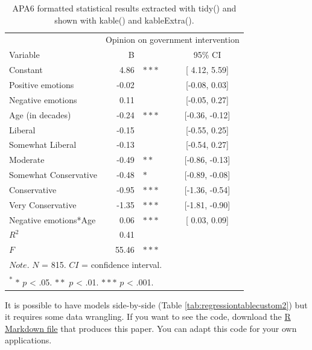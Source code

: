 \documentclass[doc,floatsintext]{apa6}
\begin{document}
\begin{table}[!h]

\caption{\label{tab:regressiontablecustom}APA6 formatted statistical results extracted with tidy() and 
                 shown with kable() and kableExtra().}
\centering
\begin{tabular}[t]{lrlc}
\toprule
\multicolumn{1}{c}{ } & \multicolumn{3}{c}{Opinion on government intervention} \\
\cmidrule(l{3pt}r{3pt}){2-4}
Variable & B &  & 95\% CI\\
\midrule
Constant & 4.86 & $***$ & [ 4.12,  5.59]\\
Positive emotions & -0.02 &  & [-0.08,  0.03]\\
Negative emotions & 0.11 &  & [-0.05,  0.27]\\
Age (in decades) & -0.24 & $***$ & [-0.36, -0.12]\\
Liberal & -0.15 &  & [-0.55,  0.25]\\
\addlinespace
Somewhat Liberal & -0.13 &  & [-0.54,  0.27]\\
Moderate & -0.49 & $**$ & [-0.86, -0.13]\\
Somewhat Conservative & -0.48 & $*$ & [-0.89, -0.08]\\
Conservative & -0.95 & $***$ & [-1.36, -0.54]\\
Very Conservative & -1.35 & $***$ & [-1.81, -0.90]\\
\addlinespace
Negative emotions*Age & 0.06 & $***$ & [ 0.03,  0.09]\\
$R^2$ & 0.41 &  & \\
$F$ & 55.46 & $***$ & \\
\bottomrule
\multicolumn{4}{l}{$Note$. $N$ = 815. $CI$ = confidence interval.}\\
\multicolumn{4}{l}{\textsuperscript{*} $*$ $p$ < .05. $**$ $p$ < .01. $***$ $p$ < .001.}\\
\end{tabular}
\end{table}

It is possible to have models side-by-side (Table
\ref{tab:regressiontablecustom2}) but it requires some data wrangling.
If you want to see the code, download the
\href{https://wdenooy.github.io/Switch2R/HelpMyCollaboratorUsesR.Rmd}{R
Markdown file} that produces this paper. You can adapt this code for
your own applications.
\end{document}
